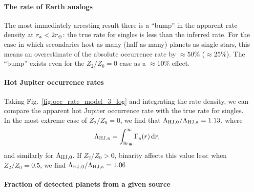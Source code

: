 \documentclass[12pt,modern]{aastex61}
\renewcommand{\a}{_{\rm a}}
\begin{document}
\paragraph{The rate of Earth analogs}
The most immediately arresting result there is a ``bump'' in the apparent rate 
density at $r\a < 2r_\oplus$: the true rate for singles is less than the 
inferred rate.
For the case in which secondaries host as many (half as many) planets as 
single stars, this means an overestimate of the absolute occurrence rate by 
$\approx 50\%$ ($\approx 25\%$).
The ``bump'' exists even for the $Z_2/Z_0=0$ case as a $\approx 10\%$ effect.

\paragraph{Hot Jupiter occurrence rates}
Taking Fig.~\ref{fig:occ_rate_model_3_log} and integrating the rate density, 
we can compare the apparent hot Jupiter 
occurrence rate with the true rate for singles.
In the most extreme case of $Z_2/Z_0=0$, we find that $\Lambda_{{\rm 
HJ},0}/\Lambda_{\rm HJ,a} = 1.13$, where
\begin{equation}
\Lambda_{\rm HJ,a} = \int_{8r_\oplus}^{\infty} \Gamma\a(r)\,{\rm d}r,
\end{equation}
and similarly for $\Lambda_{\rm HJ,0}$.
If $Z_2/Z_0>0$, binarity affects this value less: when $Z_2/Z_0=0.5$, 
we find $\Lambda_{{\rm HJ},0}/\Lambda_{\rm HJ,a} = 1.06$

\paragraph{Fraction of detected planets from a given source}
\end{document}
